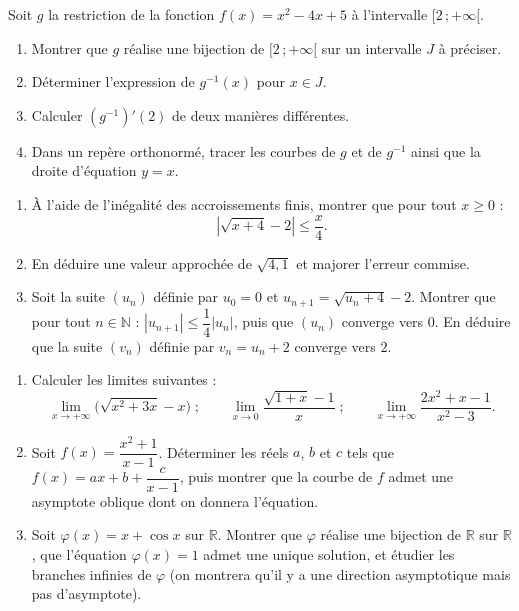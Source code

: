 \documentclass[11pt]{article}
\begin{document}
\begin{exercice}
Soit $g$ la restriction de la fonction $f(x)=x^2-4x+5$ à l'intervalle $[2\,;+\infty[$.
\begin{enumerate}
\item Montrer que $g$ réalise une bijection de $[2\,;+\infty[$ sur un intervalle $J$ à préciser.
\item Déterminer l'expression de $g^{-1}(x)$ pour $x\in J$.
\item Calculer $(g^{-1})'(2)$ de deux manières différentes.
\item Dans un repère orthonormé, tracer les courbes de $g$ et de $g^{-1}$ ainsi que la droite d'équation $y=x$.
\end{enumerate}
\end{exercice}

\begin{exercice}
\begin{enumerate}
\item À l'aide de l'inégalité des accroissements finis, montrer que pour tout $x\geq 0$ :
\[ \left|\sqrt{x+4}-2\right|\leq \frac{x}{4}. \]
\item En déduire une valeur approchée de $\sqrt{4,1}$ et majorer l'erreur commise.
\item Soit la suite $(u_n)$ définie par $u_0=0$ et $u_{n+1}=\sqrt{u_n+4}-2$.
Montrer que pour tout $n\in\mathbb{N}$ : $|u_{n+1}|\leq \dfrac{1}{4}|u_n|$, puis que $(u_n)$ converge vers $0$.
En déduire que la suite $(v_n)$ définie par $v_n = u_n+2$ converge vers $2$.
\end{enumerate}
\end{exercice}

\begin{exercice}
\begin{enumerate}
\item Calculer les limites suivantes :
\[ \lim_{x\to+\infty}\big(\sqrt{x^2+3x}-x\big)\;;\qquad \lim_{x\to 0}\frac{\sqrt{1+x}-1}{x}\;;\qquad \lim_{x\to+\infty}\frac{2x^2+x-1}{x^2-3}. \]
\item Soit $f(x)=\dfrac{x^2+1}{x-1}$. Déterminer les réels $a$, $b$ et $c$ tels que $f(x)=ax+b+\dfrac{c}{x-1}$, puis montrer que la courbe de $f$ admet une asymptote oblique dont on donnera l'équation.
\item Soit $\varphi(x)=x+\cos x$ sur $\mathbb{R}$. Montrer que $\varphi$ réalise une bijection de $\mathbb{R}$ sur $\mathbb{R}$, que l'équation $\varphi(x)=1$ admet une unique solution, et étudier les branches infinies de $\varphi$ (on montrera qu'il y a une direction asymptotique mais pas d'asymptote).
\end{enumerate}
\end{exercice}
\end{document}
